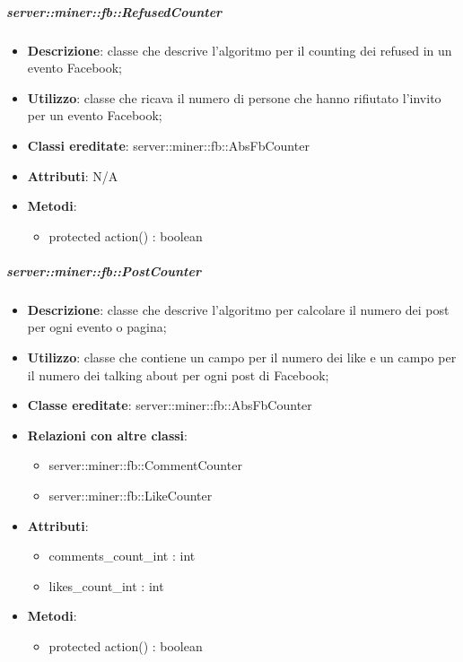 	\subparagraph{server::miner::fb::RefusedCounter} %
		\label{subp:server_miner_fb_RefusedCounter}
			\begin{itemize}
				\item \textbf{Descrizione}: classe che descrive l'algoritmo per il counting dei refused in un evento Facebook;
				\item \textbf{Utilizzo}: classe che ricava il numero di persone che hanno rifiutato l'invito per un evento Facebook;
				\item \textbf{Classi ereditate}: server::miner::fb::AbsFbCounter
				\item \textbf{Attributi}: N/A
				\item \textbf{Metodi}:  
					\begin{itemize}
						\item protected action() : boolean
					\end{itemize}
			\end{itemize}

	\subparagraph{server::miner::fb::PostCounter} %
		\label{subp:server_miner_fb_PostCounter}
			\begin{itemize}
				\item \textbf{Descrizione}: classe che descrive l'algoritmo per calcolare il numero dei post per ogni evento o pagina;
				\item \textbf{Utilizzo}: classe che contiene un campo per il numero dei like e un campo per il numero dei talking about per ogni post di Facebook;
				\item \textbf{Classe ereditate}: server::miner::fb::AbsFbCounter
				\item \textbf{Relazioni con altre classi}:
					\begin{itemize}
						\item server::miner::fb::CommentCounter
						\item server::miner::fb::LikeCounter
					\end{itemize}
				\item \textbf{Attributi}:  
					\begin{itemize}
						\item comments\_count\_int : int
						\item likes\_count\_int : int
					\end{itemize}
				\item \textbf{Metodi}:  
					\begin{itemize}
						\item protected action() : boolean
					\end{itemize}
			\end{itemize}

